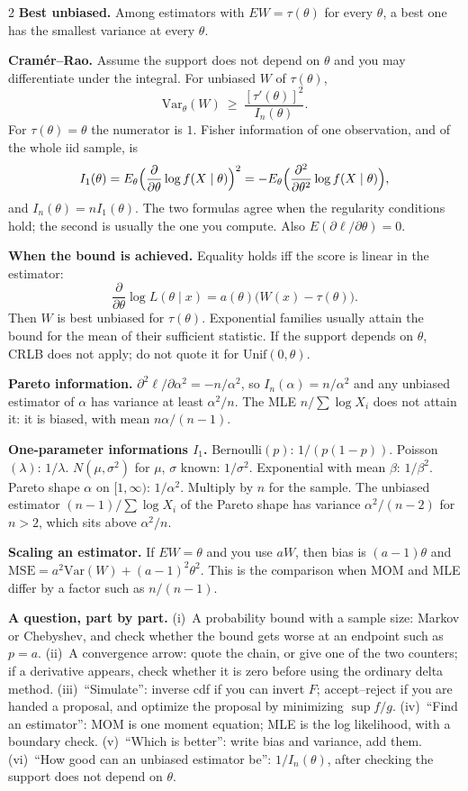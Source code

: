 \documentclass{article}
\newcommand{\kw}[1]{\textbf{#1}}
\begin{document}
\begin{multicols}{2}
\kw{Best unbiased.} Among estimators with $EW=\tau(\theta)$ for every $\theta$, a best one has the smallest variance at every $\theta$.

\kw{Cram\'er--Rao.} Assume the support does not depend on $\theta$ and you may differentiate under the integral. For unbiased $W$ of $\tau(\theta)$,
\[
\mathrm{Var}_\theta(W)\ \ge\ \frac{[\tau'(\theta)]^2}{I_n(\theta)}.
\]
For $\tau(\theta)=\theta$ the numerator is $1$. Fisher information of one observation, and of the whole iid sample, is
\[
I_1(\theta)=E_\theta\Bigl(\frac{\partial}{\partial\theta}\log f(X\mid\theta)\Bigr)^2
=-E_\theta\Bigl(\frac{\partial^2}{\partial\theta^2}\log f(X\mid\theta)\Bigr),
\]
and $I_n(\theta)=n I_1(\theta)$. The two formulas agree when the regularity conditions hold; the second is usually the one you compute. Also $E(\partial\ell/\partial\theta)=0$.

\kw{When the bound is achieved.} Equality holds iff the score is linear in the estimator:
\[
\frac{\partial}{\partial\theta}\log L(\theta\mid x)=a(\theta)\bigl(W(x)-\tau(\theta)\bigr).
\]
Then $W$ is best unbiased for $\tau(\theta)$. Exponential families usually attain the bound for the mean of their sufficient statistic. If the support depends on $\theta$, CRLB does not apply; do not quote it for $\mathrm{Unif}(0,\theta)$.

\kw{Pareto information.} $\partial^2\ell/\partial\alpha^2=-n/\alpha^2$, so $I_n(\alpha)=n/\alpha^2$ and any unbiased estimator of $\alpha$ has variance at least $\alpha^2/n$. The MLE $n/\sum\log X_i$ does not attain it: it is biased, with mean $n\alpha/(n-1)$.

\kw{One-parameter informations $I_1$.} Bernoulli$(p)$: $1/(p(1-p))$. Poisson$(\lambda)$: $1/\lambda$. $N(\mu,\sigma^2)$ for $\mu$, $\sigma$ known: $1/\sigma^2$. Exponential with mean $\beta$: $1/\beta^2$. Pareto shape $\alpha$ on $[1,\infty)$: $1/\alpha^2$. Multiply by $n$ for the sample. The unbiased estimator $(n-1)/\sum\log X_i$ of the Pareto shape has variance $\alpha^2/(n-2)$ for $n>2$, which sits above $\alpha^2/n$.

\kw{Scaling an estimator.} If $EW=\theta$ and you use $aW$, then bias is $(a-1)\theta$ and $\mathrm{MSE}=a^2\mathrm{Var}(W)+(a-1)^2\theta^2$. This is the comparison when MOM and MLE differ by a factor such as $n/(n-1)$.

\kw{A question, part by part.} (i)~A probability bound with a sample size: Markov or Chebyshev, and check whether the bound gets worse at an endpoint such as $p=a$. (ii)~A convergence arrow: quote the chain, or give one of the two counters; if a derivative appears, check whether it is zero before using the ordinary delta method. (iii)~``Simulate'': inverse cdf if you can invert $F$; accept--reject if you are handed a proposal, and optimize the proposal by minimizing $\sup f/g$. (iv)~``Find an estimator'': MOM is one moment equation; MLE is the log likelihood, with a boundary check. (v)~``Which is better'': write bias and variance, add them. (vi)~``How good can an unbiased estimator be'': $1/I_n(\theta)$, after checking the support does not depend on $\theta$.

\end{multicols}
\end{document}
